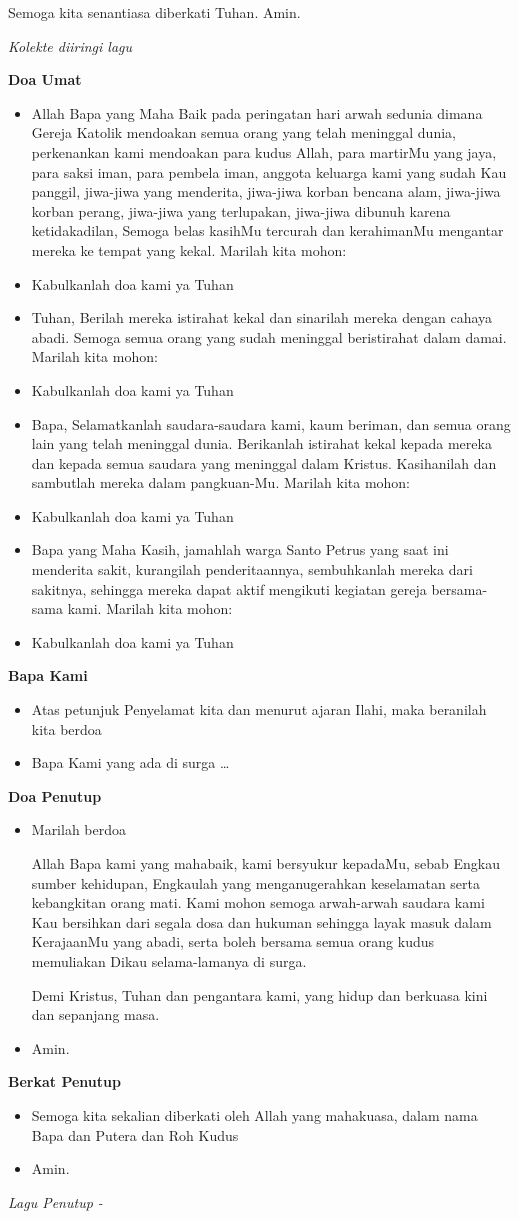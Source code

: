 \documentclass[a5paper,headsepline,titlepage,10pt,nnormalheadings,DIVcalc]{scrbook}
\makeatletter
\newcommand{\subjudul}[1]{%
  {\parindent \z@ 
    \interlinepenalty\@M \bfseries #1\par\nobreak \vskip 10\p@ }}
\newcommand{\lagu}[1]{%
  {\parindent \z@ 
    \interlinepenalty\@M \slshape \mdseries \Large \textsl{#1}\par\nobreak \vskip 20\p@ }}
\newcommand{\BU}[1]{\begin{itemize} \item[U:] #1 \end{itemize}}
\newcommand{\BP}[1]{\begin{itemize} \item[P:] #1 \end{itemize}}
\newcommand{\lagupenutup}{~}
\makeatother
\begin{document}
Semoga kita senantiasa diberkati Tuhan. Amin.

\lagu{Kolekte diiringi lagu}

\subjudul{Doa Umat}

\BP{Allah Bapa yang Maha Baik pada peringatan hari arwah sedunia dimana Gereja Katolik mendoakan semua orang yang telah meninggal dunia, perkenankan kami mendoakan para kudus Allah, para martirMu yang jaya, para saksi iman, para pembela iman, anggota keluarga kami yang sudah Kau panggil, 
jiwa-jiwa yang menderita,
jiwa-jiwa korban bencana alam,
jiwa-jiwa korban perang,  
jiwa-jiwa yang terlupakan, 
jiwa-jiwa dibunuh karena ketidakadilan,
Semoga belas kasihMu tercurah dan kerahimanMu mengantar mereka ke tempat yang kekal.
Marilah kita mohon:}

\BU{Kabulkanlah doa kami ya Tuhan}

\BP{Tuhan,
Berilah mereka istirahat kekal dan sinarilah mereka dengan cahaya abadi. Semoga semua orang yang sudah meninggal beristirahat dalam damai.
 Marilah kita mohon:}

\BU{Kabulkanlah doa kami ya Tuhan}


\BP{Bapa,
Selamatkanlah saudara-saudara kami, kaum beriman, dan semua orang lain yang telah meninggal dunia. Berikanlah istirahat kekal kepada mereka dan kepada semua saudara yang meninggal dalam Kristus. Kasihanilah dan sambutlah mereka dalam pangkuan-Mu.
Marilah kita mohon:}

\BU{Kabulkanlah doa kami ya Tuhan}

\BP{Bapa yang Maha Kasih, jamahlah warga Santo Petrus yang saat ini menderita
sakit, kurangilah penderitaannya, sembuhkanlah mereka dari sakitnya, sehingga mereka
dapat aktif mengikuti kegiatan gereja bersama-sama kami. Marilah kita mohon:}

\BU{Kabulkanlah doa kami ya Tuhan}

\subjudul{Bapa Kami}
\BP{Atas petunjuk Penyelamat kita dan menurut ajaran Ilahi, maka beranilah
kita berdoa}

\BU{Bapa Kami yang ada di surga \dots}


\subjudul{Doa Penutup}
\BP{Marilah berdoa

Allah Bapa kami yang mahabaik, kami bersyukur kepadaMu, sebab Engkau sumber kehidupan, Engkaulah yang menganugerahkan keselamatan serta kebangkitan orang mati. Kami mohon semoga arwah-arwah saudara kami Kau bersihkan dari segala dosa dan hukuman sehingga layak masuk dalam KerajaanMu yang abadi, serta boleh bersama semua orang kudus memuliakan Dikau selama-lamanya di surga. 

Demi Kristus, Tuhan dan pengantara kami, yang hidup dan berkuasa kini dan sepanjang masa.}
\BU{Amin.}

\subjudul{Berkat Penutup}
\BP{Semoga kita sekalian diberkati oleh Allah yang mahakuasa, dalam nama Bapa dan
Putera dan Roh Kudus}
\BU{Amin.}

\lagu{Lagu Penutup - \lagupenutup}
\end{document}
